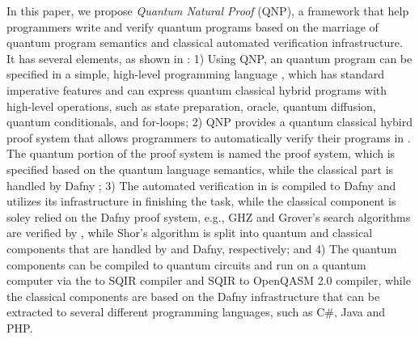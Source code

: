 In this paper, we propose \emph{Quantum Natural Proof} (QNP), a framework that help programmers write and verify quantum programs based on the marriage of quantum program semantics and classical automated verification infrastructure. It has several elements, as shown in :
1) Using QNP, an quantum program can be specified in a simple, high-level programming
language \qafny, which has standard imperative features and
can express quantum classical hybrid programs with high-level operations,
such as state preparation, oracle, quantum diffusion, quantum conditionals, and for-loops;
2) QNP provides a quantum classical hybird proof system that allows programmers to automatically verify their programs in \qafny.
The quantum portion of the proof system is named the \qafny proof system,
which is specified based on the \qafny quantum language semantics, while the classical part is handled by Dafny \cite{dafnyref};
3) The automated verification in \qafny is compiled to Dafny and utilizes its infrastructure in finishing the task, while the classical component is soley relied on the Dafny proof system, e.g., GHZ and Grover's search algorithms are verified by \qafny, while Shor's algorithm is split into quantum and classical components that are handled by \qafny and Dafny, respectively;
and 4) The \qafny quantum components can be compiled to quantum circuits and run on a quantum computer via the \qafny to SQIR compiler and SQIR to OpenQASM 2.0 \cite{Cross2017} compiler, while the classical components are based on the Dafny infrastructure that can be extracted to several different programming languages, such as C\#, Java and PHP.

